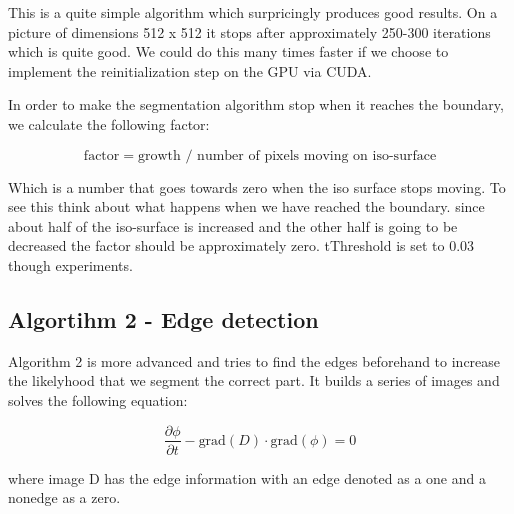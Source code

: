 This is a quite simple algorithm which surpricingly produces good results. On a picture of dimensions 512 x 512 it stops after approximately 250-300 iterations which is quite good. We could do this many times faster if we choose to implement the reinitialization step on the GPU via CUDA.

In order to make the segmentation algorithm stop when it reaches the boundary, we calculate the following factor:

\begin{equation*}
 \textrm{factor} = \textrm{growth } / \textrm{ number of pixels moving on iso-surface}
\end{equation*}

Which is a number that goes towards zero when the iso surface stops moving. To see this think about what happens when we have reached the boundary. since about half of the iso-surface is increased and the other half is going to be decreased the factor should be approximately zero. tThreshold is set to 0.03 though experiments.


\subsection{Algortihm 2 - Edge detection}
\label{segmentation:sec:algorithm2}


Algorithm 2 is more advanced and tries to find the edges beforehand to increase the likelyhood that we segment the correct part. It builds a series of images and solves the following equation:

\begin{equation}
\label{segmentation:equation:advanced}
  \dfrac{\partial \phi}{\partial t} - \textrm{grad}(D) \cdot \textrm{grad}(\phi) = 0
\end{equation}

where image D has the edge information with an edge denoted as a one and a nonedge as a zero.

